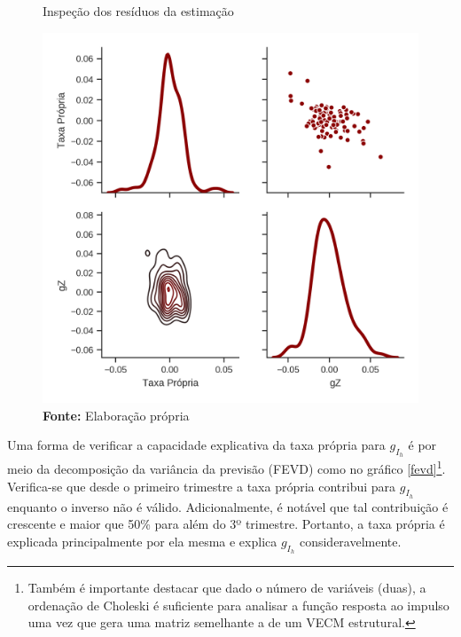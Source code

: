 \begin{figure}[H]
	\centering
	\caption{Inspeção dos resíduos da estimação}
	\label{residuos}
	\includegraphics[height=.4\textheight]{../../Modelo/SeriesTemporais/figs/Residuos_4VECM.png}
	\caption*{\textbf{Fonte:} Elaboração própria}
\end{figure}




Uma forma de verificar a capacidade explicativa da taxa própria para $g_{I_h}$ é por meio da decomposição da variância da previsão (FEVD) como no gráfico \ref{fevd}\footnote{Também é importante destacar que dado o número de variáveis (duas), a ordenação de Choleski é suficiente para analisar a função resposta ao impulso uma vez que gera uma matriz semelhante a de um VECM estrutural. 
}. Verifica-se que desde o primeiro trimestre a taxa própria contribui para $g_{I_h}$ enquanto o inverso não é válido. Adicionalmente, é notável que tal contribuição é crescente e maior que 50\% para além do 3º trimestre. Portanto, a taxa própria é explicada principalmente por ela mesma e explica $g_{I_h}$ consideravelmente.

